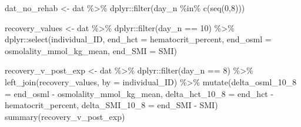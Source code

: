 \documentclass[
]{article}
\newenvironment{Shaded}{\begin{snugshade}}{\end{snugshade}}
\newcommand{\AttributeTok}[1]{\textcolor[rgb]{0.77,0.63,0.00}{#1}}
\newcommand{\DecValTok}[1]{\textcolor[rgb]{0.00,0.00,0.81}{#1}}
\newcommand{\FunctionTok}[1]{\textcolor[rgb]{0.00,0.00,0.00}{#1}}
\newcommand{\NormalTok}[1]{#1}
\newcommand{\OtherTok}[1]{\textcolor[rgb]{0.56,0.35,0.01}{#1}}
\newcommand{\SpecialCharTok}[1]{\textcolor[rgb]{0.00,0.00,0.00}{#1}}
\newcommand{\StringTok}[1]{\textcolor[rgb]{0.31,0.60,0.02}{#1}}
\begin{document}
\begin{Shaded}
\begin{Highlighting}[]
\NormalTok{dat\_no\_rehab }\OtherTok{\textless{}{-}}\NormalTok{ dat }\SpecialCharTok{\%\textgreater{}\%}
\NormalTok{  dplyr}\SpecialCharTok{::}\FunctionTok{filter}\NormalTok{(day\_n }\SpecialCharTok{\%in\%} \FunctionTok{c}\NormalTok{(}\FunctionTok{seq}\NormalTok{(}\DecValTok{0}\NormalTok{,}\DecValTok{8}\NormalTok{))) }

\NormalTok{recovery\_values }\OtherTok{\textless{}{-}}\NormalTok{ dat }\SpecialCharTok{\%\textgreater{}\%}
\NormalTok{  dplyr}\SpecialCharTok{::}\FunctionTok{filter}\NormalTok{(day\_n }\SpecialCharTok{==} \DecValTok{10}\NormalTok{) }\SpecialCharTok{\%\textgreater{}\%}
\NormalTok{  dplyr}\SpecialCharTok{::}\FunctionTok{select}\NormalTok{(individual\_ID,}
                \AttributeTok{end\_hct =}\NormalTok{ hematocrit\_percent,}
                \AttributeTok{end\_osml =}\NormalTok{ osmolality\_mmol\_kg\_mean,}
                \AttributeTok{end\_SMI =}\NormalTok{ SMI)}

\NormalTok{recovery\_v\_post\_exp }\OtherTok{\textless{}{-}}\NormalTok{ dat }\SpecialCharTok{\%\textgreater{}\%}
\NormalTok{  dplyr}\SpecialCharTok{::}\FunctionTok{filter}\NormalTok{(day\_n }\SpecialCharTok{==} \DecValTok{8}\NormalTok{) }\SpecialCharTok{\%\textgreater{}\%}
  \FunctionTok{left\_join}\NormalTok{(recovery\_values, }\AttributeTok{by =} \StringTok{\textquotesingle{}individual\_ID\textquotesingle{}}\NormalTok{) }\SpecialCharTok{\%\textgreater{}\%}
  \FunctionTok{mutate}\NormalTok{(}\AttributeTok{delta\_osml\_10\_8 =}\NormalTok{ end\_osml }\SpecialCharTok{{-}}\NormalTok{ osmolality\_mmol\_kg\_mean,}
         \AttributeTok{delta\_hct\_10\_8 =}\NormalTok{ end\_hct }\SpecialCharTok{{-}}\NormalTok{ hematocrit\_percent,}
         \AttributeTok{delta\_SMI\_10\_8 =}\NormalTok{ end\_SMI }\SpecialCharTok{{-}}\NormalTok{ SMI)}
\FunctionTok{summary}\NormalTok{(recovery\_v\_post\_exp)}
\end{Highlighting}
\end{Shaded}
\end{document}
